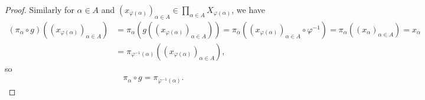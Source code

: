 \documentclass[12pt]{extarticle}
\newcommand{\<}{\langle}
\renewcommand{\>}{\rangle}
\theoremstyle{definition}
\begin{document}
\begin{proof}
  Similarly for $\alpha \in A$ and $(x_{\varphi(\alpha)})_{\alpha \in A} \in \prod\limits_{\alpha \in A} X_{\varphi(\alpha)}$, we have
  \begin{align*}
    (\pi_{\alpha}\circ g)((x_{\varphi(\alpha)})_{\alpha \in A}) &= \pi_{\alpha}(g((x_{\varphi(\alpha)})_{\alpha \in A})) = \pi_{\alpha}((x_{\varphi(\alpha)})_{\alpha \in A} \circ \varphi^{-1}) = \pi_{\alpha}((x_{\alpha})_{\alpha \in A}) = x_{\alpha} \\
    &= \pi_{\varphi^{-1}(\alpha)}((x_{\varphi(\alpha)})_{\alpha \in A}),
  \end{align*}
  so
  \begin{align*}
    \pi_{\alpha}\circ g = \pi_{\varphi^{-1}(\alpha)}.
  \end{align*}
\end{proof}
\end{document}
